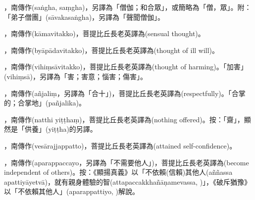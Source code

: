\startitemgroup[noteitems]
\item{}，南傳作(saṅgha, saṃgha)，另譯為「僧伽；和合眾」，或簡略為「僧，眾」。附：「弟子僧團」(sāvakasaṅgha)，另譯為「聲聞僧伽」。
\stopitemgroup

\startitemgroup[noteitems]
\item{}，南傳作(kāmavitakko)，菩提比丘長老英譯為(sensual thought)。
\item{}，南傳作(byāpādavitakko)，菩提比丘長老英譯為(thought of ill will)。
\item{}，南傳作(vihiṃsāvitakko)，菩提比丘長老英譯為(thought of harming)。「加害」(vihiṃsā)，另譯為「害；害意；惱害；傷害」。
\stopitemgroup

\startitemgroup[noteitems]
\item{}，南傳作(añjaliṃ，另譯為「合十」)，菩提比丘長老英譯為(respectfully)。「合掌的；合掌地」(pañjalika)。 
\stopitemgroup

\startitemgroup[noteitems]
\item{}，南傳作(natthi yiṭṭhaṃ)，菩提比丘長老英譯為(nothing offered)。按：「齋」，顯然是「供養」(yiṭṭha)的另譯。
\stopitemgroup

\startitemgroup[noteitems]
\item{}，南傳作(vesārajjappatto)，菩提比丘長老英譯為(attained self-confidence)。
\stopitemgroup

\startitemgroup[noteitems]
\item{}，南傳作(aparappaccayo，另譯為「不需要他人」)，菩提比丘長老英譯為(become independent of others)。按：《顯揚真義》以「不依賴(信賴)其他人(aññassa apattiyāyetvā)，就有親身體驗的智(attapaccakkhañāṇamevassa, )」，《破斥猶豫》以「不依賴其他人」(aparappattiyo, )解說。
\stopitemgroup

